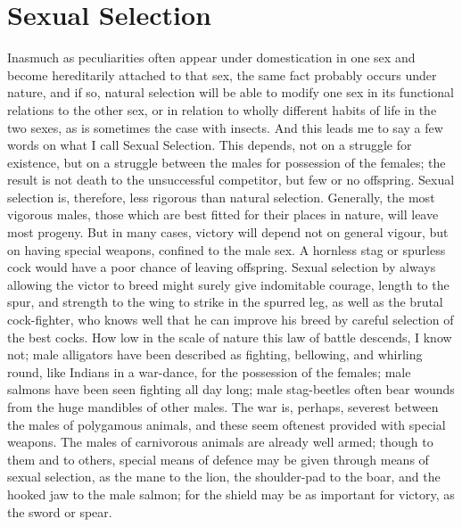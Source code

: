 \section{Sexual Selection}
\indent Inasmuch as peculiarities often appear under domestication in one sex and become hereditarily attached to that sex, the same fact probably occurs under nature, and if so, natural selection will be able to modify one sex in its functional relations to the other sex, or in relation to wholly different habits of life in the two sexes, as is sometimes the case with insects. And this leads me to say a few words on what I call Sexual Selection. This depends, not on a struggle for existence, but on a struggle between the males for possession of the females; the result is not death to the unsuccessful competitor, but few or no offspring.  Sexual selection is, therefore, less rigorous than natural selection. Generally, the most vigorous males, those which are best fitted for their places in nature, will leave most progeny. But in many cases, victory will depend not on general vigour, but on having special weapons, confined to the male sex. A hornless stag or spurless cock would have a poor chance of leaving offspring. Sexual selection by always allowing the victor to breed might surely give indomitable courage, length to the spur, and strength to the wing to strike in the spurred leg, as well as the brutal cock-fighter, who knows well that he can improve his breed by careful selection of the best cocks. How low in the scale of nature this law of battle descends, I know not; male alligators have been described as fighting, bellowing, and whirling round, like Indians in a war-dance, for the possession of the females; male salmons have been seen fighting all day long; male stag-beetles often bear wounds from the huge mandibles of other males.  The war is, perhaps, severest between the males of polygamous animals, and these seem oftenest provided with special weapons. The males of carnivorous animals are already well armed; though to them and to others, special means of defence may be given through means of sexual selection, as the mane to the lion, the shoulder-pad to the boar, and the hooked jaw to the male salmon; for the shield may be as important for victory, as the sword or spear. \\
